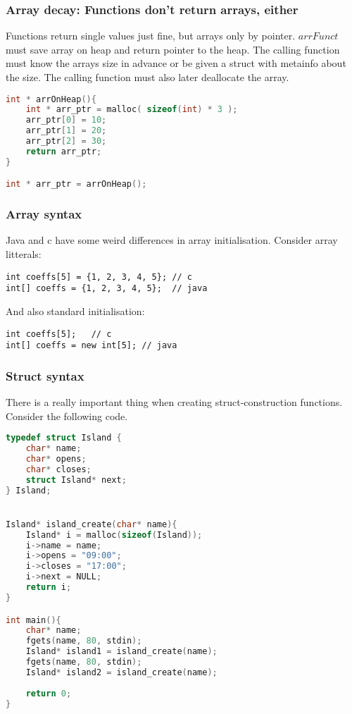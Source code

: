 \subsubsection{Array decay: Functions don't return arrays, either}

Functions return single values just fine, but arrays only by pointer. 
$arrFunct$ must save array on heap and return pointer to the heap.
The calling function must know the arrays size in advance or be given a struct with metainfo about the size.
The calling function must also later deallocate the array.

\begin{lstlisting}[language=c]
int * arrOnHeap(){
    int * arr_ptr = malloc( sizeof(int) * 3 );
    arr_ptr[0] = 10;
    arr_ptr[1] = 20;
    arr_ptr[2] = 30;
    return arr_ptr;
}

int * arr_ptr = arrOnHeap();
\end{lstlisting}


\subsubsection{Array syntax} 
Java and c have some weird differences in array initialisation. Consider array litterals: 
\begin{lstlisting}
int coeffs[5] = {1, 2, 3, 4, 5}; // c
int[] coeffs = {1, 2, 3, 4, 5};  // java
\end{lstlisting}
And also standard initialisation:
\begin{lstlisting}
int coeffs[5];   // c
int[] coeffs = new int[5]; // java
\end{lstlisting}


\subsubsection{Struct syntax}

There is a really important thing when creating struct-construction functions.
Consider the following code. 

\begin{lstlisting}[language=c]
typedef struct Island {
	char* name;
	char* opens;
	char* closes;
	struct Island* next;
} Island;


Island* island_create(char* name){
	Island* i = malloc(sizeof(Island));
	i->name = name;
	i->opens = "09:00";
	i->closes = "17:00";
	i->next = NULL;
	return i;
}

int main(){
    char* name;
    fgets(name, 80, stdin);
    Island* island1 = island_create(name);
    fgets(name, 80, stdin);
    Island* island2 = island_create(name);
    
    return 0;
}
\end{lstlisting}

